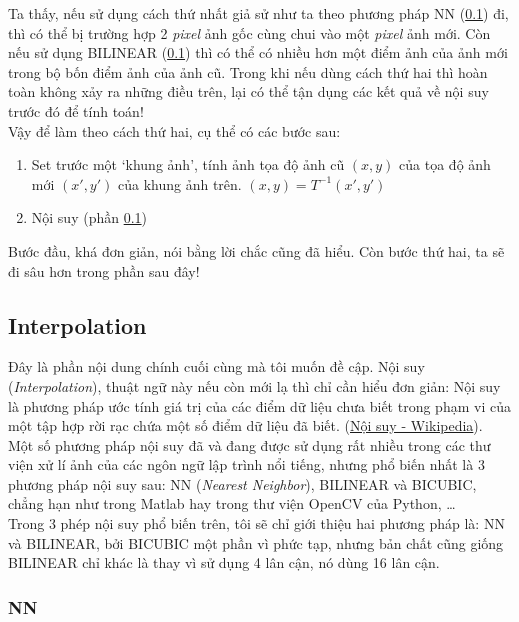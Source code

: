 \documentclass{article}
\begin{document}
Ta thấy, nếu sử dụng cách thứ nhất giả sử như ta theo phương pháp NN (\ref{n3}) đi, thì có thể bị trường hợp 2 \textit{pixel} ảnh gốc cùng chui vào một \textit{pixel} ảnh mới. Còn nếu sử dụng BILINEAR (\ref{n3}) thì có thể có nhiều hơn một điểm ảnh của ảnh mới trong bộ bốn điểm ảnh của ảnh cũ. Trong khi nếu dùng cách thứ hai thì hoàn toàn không xảy ra những điều trên, lại có thể tận dụng các kết quả về nội suy trước đó để tính toán!\\
Vậy để làm theo cách thứ hai, cụ thể có các bước sau:
\begin{enumerate}
    \item Set trước một `khung ảnh', tính ảnh tọa độ ảnh cũ $(x, y)$ của tọa độ ảnh mới $(x', y')$ của khung ảnh trên. $(x,y) = T^{-1}(x',y')$
    \item Nội suy (phần \ref{n3})
\end{enumerate}
Bước đầu, khá đơn giản, nói bằng lời chắc cũng đã hiểu. Còn bước thứ hai, ta sẽ đi sâu hơn trong phần sau đây!
\subsection{Interpolation}
\label{n3}
Đây là phần nội dung chính cuối cùng mà tôi muốn đề cập. Nội suy (\textit{Interpolation}), thuật ngữ này nếu còn mới lạ thì chỉ cần hiểu đơn giản: Nội suy là phương pháp ước tính giá trị của các điểm dữ liệu chưa biết trong phạm vi của một tập hợp rời rạc chứa một số điểm dữ liệu đã biết. (\href{https://vi.wikipedia.org/wiki/N%E1%BB%99i_suy}{Nội suy - Wikipedia}).\\
Một số phương pháp nội suy đã và đang được sử dụng rất nhiều trong các thư viện xử lí ảnh của các ngôn ngữ lập trình nổi tiếng, nhưng phổ biến nhất là 3 phương pháp nội suy sau: NN (\textit{Nearest Neighbor}), BILINEAR và BICUBIC, chẳng hạn như trong Matlab hay trong thư viện OpenCV của Python, \ldots\\
Trong 3 phép nội suy phổ biến trên, tôi sẽ chỉ giới thiệu hai phương pháp là: NN và BILINEAR, bởi BICUBIC một phần vì phức tạp, nhưng bản chất cũng giống BILINEAR chỉ khác là thay vì sử dụng 4 lân cận, nó dùng 16 lân cận.

\subsubsection{NN}
\end{document}
